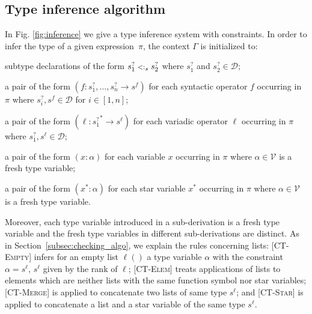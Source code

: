 \documentclass{eptcs}
\newcommand{\VV}{\ensuremath{\mathcal{V}}\xspace}
\newcommand{\caD}{\ensuremath{\mathcal{D}}\xspace}
\newcommand{\xx}{\ensuremath{x^*}\xspace}
\newcommand{\CTEmpty}{{\small \textsc{CT-Empty}}}
\newcommand{\CTElem}{{\small \textsc{CT-Elem}}}
\newcommand{\CTStar}{{\small \textsc{CT-Star}}}
\newcommand{\CTMerge}{{\small \textsc{CT-Merge}}}
\newcommand{\sub}{\mathrel{\mbox{{\footnotesize $<:$}}}}
\newcommand{\sig}[2]{\ensuremath{{#1}\rightarrow{#2}}}
\newcommand{\vsig}[2]{\ensuremath{{#1}^*\rightarrow{#2}}}
\begin{document}
\subsection{Type inference algorithm}
\label{subsec:inference_algo}

In Fig. \ref{fig:inference} we give a type inference system with constraints.
In order to infer the type of a given expression~$\pi$, the context $\Gamma$ is initialized to: 
\begin{inparaenum}[1)]
\item subtype declarations of the form $s_1^? \sub_s s_2^?$ where $s_1^?$ and $s_2^? \in \caD$;
\item a pair of the form $(f : \sig{s_1^?,\ldots,s_n^?}{s^f})$ for each
syntactic operator $f$ occurring in $\pi$ where $s_i^?,s^f \in \caD$ for $i \in [1,n]$;
\item a pair of the form $(\ell : \vsig{s_1^?}{s^{\ell}})$ for each variadic
operator $\ell$ occurring in $\pi$ where $s_1^?,s^{\ell} \in \caD$;
\item a pair of the form $(x : \alpha)$ for each variable $x$ occurring in $\pi$ where $\alpha \in \VV$ is a fresh type variable;
\item a pair of the form $(\xx : \alpha)$ for each star variable $x^*$ occurring
in $\pi$ where $\alpha \in \VV$ is a fresh type variable.
\end{inparaenum}
Moreover, each type variable introduced in a sub-derivation is a fresh type variable and
the fresh type variables in different sub-derivations are distinct. As in Section~\ref{subsec:checking_algo}, we explain the rules concerning lists: [\CTEmpty] infers for an empty list $\ell()$ a type variable
$\alpha$ with the constraint $\alpha = s^{\ell}$, $s^{\ell}$ given by the rank of
$\ell$; [\CTElem] treats applications of lists to elements which are neither lists
with the same function symbol nor star variables; [\CTMerge] is applied to
concatenate two lists of same type $s^{\ell}$; and [\CTStar] is applied to
concatenate a list and a star variable of the same type $s^{\ell}$.
\end{document}
